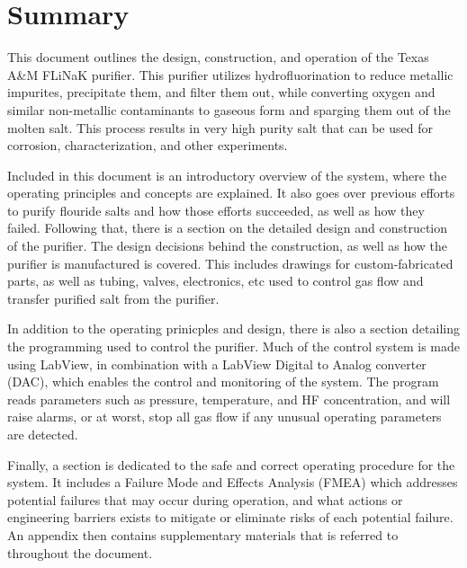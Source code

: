 %
%

\section{Summary}
This document outlines the design, construction, and operation of the
Texas A\&M FLiNaK purifier. This purifier utilizes
hydrofluorination to reduce metallic impurites, precipitate them, and filter
them out, while converting oxygen and similar non-metallic contaminants to
gaseous form and sparging them out of the molten salt. This process results in
very high purity salt that can be used for corrosion, characterization, and
other experiments. \par

Included in this document is an introductory overview of the system, where the
operating principles and concepts are explained. It also goes over previous
efforts to purify flouride salts and how those efforts succeeded, as well as
how they failed. Following that, there is a section on the detailed design and
construction of the purifier. The design decisions behind the construction, as
well as how the purifier is manufactured is covered. This includes
drawings for custom-fabricated parts, as well as tubing, valves, electronics,
etc used to control gas flow and transfer purified salt from the purifier. \par

In addition to the operating prinicples and design, there is also a section
detailing the programming used to control the purifier. Much of the control
system is made using LabView, in combination with a LabView Digital to Analog
converter (DAC), which enables the control and monitoring of the system.
The program reads parameters such as pressure, temperature, and HF
concentration, and will raise alarms, or at worst, stop all gas flow if
any unusual operating parameters are detected. \par

Finally, a section is dedicated to the safe and correct operating procedure for
the system. It includes a Failure Mode and Effects Analysis (FMEA) which
addresses potential failures that may occur during operation, and what actions
or engineering barriers exists to mitigate or eliminate risks of each potential
failure. An appendix then contains supplementary materials that is referred
to throughout the document. \par

\pagebreak
\tableofcontents
\pagebreak
